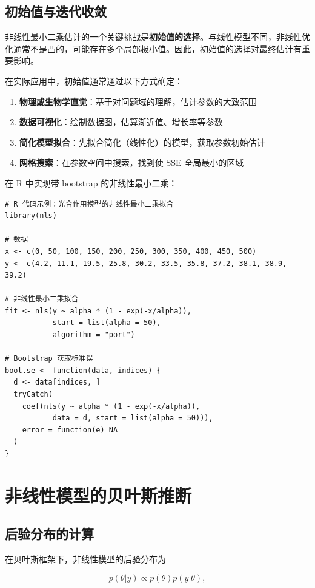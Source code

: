 \subsection{初始值与迭代收敛}

非线性最小二乘估计的一个关键挑战是\textbf{初始值的选择}。与线性模型不同，非线性优化通常不是凸的，可能存在多个局部极小值。因此，初始值的选择对最终估计有重要影响。

在实际应用中，初始值通常通过以下方式确定：

\begin{enumerate}
  \item \textbf{物理或生物学直觉}：基于对问题域的理解，估计参数的大致范围
  \item \textbf{数据可视化}：绘制数据图，估算渐近值、增长率等参数
  \item \textbf{简化模型拟合}：先拟合简化（线性化）的模型，获取参数初始估计
  \item \textbf{网格搜索}：在参数空间中搜索，找到使 SSE 全局最小的区域
\end{enumerate}

在 R 中实现带 bootstrap 的非线性最小二乘：

\begin{verbatim}
# R 代码示例：光合作用模型的非线性最小二乘拟合
library(nls)

# 数据
x <- c(0, 50, 100, 150, 200, 250, 300, 350, 400, 450, 500)
y <- c(4.2, 11.1, 19.5, 25.8, 30.2, 33.5, 35.8, 37.2, 38.1, 38.9, 39.2)

# 非线性最小二乘拟合
fit <- nls(y ~ alpha * (1 - exp(-x/alpha)),
           start = list(alpha = 50),
           algorithm = "port")

# Bootstrap 获取标准误
boot.se <- function(data, indices) {
  d <- data[indices, ]
  tryCatch(
    coef(nls(y ~ alpha * (1 - exp(-x/alpha)),
           data = d, start = list(alpha = 50))),
    error = function(e) NA
  )
}
\end{verbatim}

\section{非线性模型的贝叶斯推断}

\subsection{后验分布的计算}

在贝叶斯框架下，非线性模型的后验分布为

\begin{equation}
p(\theta | y) \propto p(\theta) p(y | \theta), \label{eq:nonlinear-posterior}
\end{equation}

